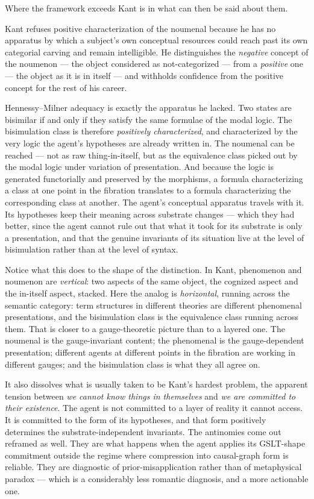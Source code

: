 Where the framework exceeds Kant is in what can then be said about
them.

Kant refuses positive characterization of the noumenal because he
has no apparatus by which a subject's own conceptual resources
could reach past its own categorial carving and remain
intelligible.
He distinguishes the \emph{negative} concept of the noumenon ---
the object considered as not-categorized --- from a \emph{positive}
one --- the object as it is in itself --- and withholds confidence
from the positive concept for the rest of his career.

Hennessy--Milner adequacy is exactly the apparatus he lacked.
Two states are bisimilar if and only if they satisfy the same
formulae of the modal logic.
The bisimulation class is therefore \emph{positively
characterized}, and characterized by the very logic the agent's
hypotheses are already written in.
The noumenal can be reached --- not as raw thing-in-itself, but as
the equivalence class picked out by the modal logic under variation
of presentation.
And because the logic is generated functorially and preserved by
the morphisms, a formula characterizing a class at one point in the
fibration translates to a formula characterizing the corresponding
class at another.
The agent's conceptual apparatus travels with it.
Its hypotheses keep their meaning across substrate changes --- which
they had better, since the agent cannot rule out that what it took
for its substrate is only a presentation, and that the genuine
invariants of its situation live at the level of bisimulation
rather than at the level of syntax.

Notice what this does to the shape of the distinction.
In Kant, phenomenon and noumenon are \emph{vertical}: two aspects of
the same object, the cognized aspect and the in-itself aspect,
stacked.
Here the analog is \emph{horizontal}, running across the semantic
category: term structures in different theories are different
phenomenal presentations, and the bisimulation class is the
equivalence class running across them.
That is closer to a gauge-theoretic picture than to a layered one.
The noumenal is the gauge-invariant content; the phenomenal is the
gauge-dependent presentation; different agents at different points
in the fibration are working in different gauges; and the
bisimulation class is what they all agree on.

It also dissolves what is usually taken to be Kant's hardest
problem, the apparent tension between \emph{we cannot know things
in themselves} and \emph{we are committed to their existence}.
The agent is not committed to a layer of reality it cannot access.
It is committed to the form of its hypotheses, and that form
positively determines the substrate-independent invariants.
The antinomies come out reframed as well.
They are what happens when the agent applies its GSLT-shape
commitment outside the regime where compression into causal-graph
form is reliable.
They are diagnostic of prior-misapplication rather than of
metaphysical paradox --- which is a considerably less romantic
diagnosis, and a more actionable one.

